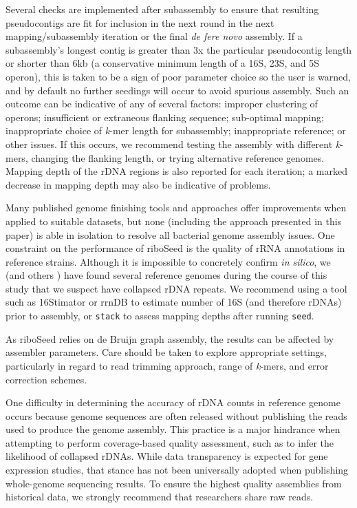 \documentclass[a4,center,fleqn]{NAR}
\begin{document}
Several checks are implemented after subassembly to ensure that resulting pseudocontigs are fit for inclusion in the next round in the next mapping/subassembly iteration or the final \textit{de fere novo} assembly. If a subassembly's longest contig is greater than 3x the particular pseudocontig length or shorter than 6kb (a conservative minimum length of a 16S, 23S, and 5S operon), this is taken to be a sign of poor parameter choice so the user is warned, and by default no further seedings will occur to avoid spurious assembly. Such an outcome can be indicative of any of several factors: improper clustering of operons; insufficient or extraneous flanking sequence; sub-optimal mapping; inappropriate choice of \textit{k}-mer length for subassembly; inappropriate reference; or other issues. If this occurs, we recommend testing the assembly with different \textit{k}-mers, changing the flanking length, or trying alternative reference genomes. Mapping depth of the rDNA regions is also reported for each iteration; a marked decrease in mapping depth may also be indicative of problems.

Many published genome finishing tools and approaches offer improvements when applied to suitable datasets, but none (including the approach presented in this paper) is able in isolation to resolve all bacterial genome assembly issues. One constraint on the performance of riboSeed is the quality of rRNA annotations in reference strains. Although it is impossible to concretely confirm \textit{in silico}, we (and others \cite{Mariano2016}) have found several reference genomes during the course of this study that we suspect have collapsed rDNA repeats. We recommend using a tool such as 16Stimator\cite{Perisin2016} or rrnDB\cite{Stoddard2014} to estimate number of 16S (and therefore rDNAs) prior to assembly, or \texttt{stack} to assess mapping depths after running \texttt{seed}.

As riboSeed relies on de Bruijn graph assembly, the results can be affected by assembler parameters. Care should be taken to explore appropriate settings, particularly in regard to read trimming approach, range of \textit{k}-mers, and error correction schemes.

One difficulty in determining the accuracy of rDNA counts in reference genome occurs because genome sequences are often released without publishing the reads used to produce the genome assembly. This practice is a major hindrance when attempting to perform coverage-based quality assessment, such as to infer the likelihood of collapsed rDNAs. While data transparency is expected for gene expression studies, that stance has not been universally adopted when publishing whole-genome sequencing results. To ensure the highest quality assemblies from historical data, we strongly recommend that researchers share raw reads.
\end{document}
